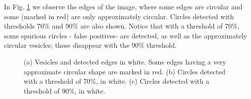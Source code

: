 \documentclass[oribibl]{llncs}
\begin{document}
In Fig. \ref{fig:umbralPorcentajeHough} we observe the edges of the image, where some edges are circular and some (marked in red) are only approximately circular. Circles detected with thresholds  70\% and 90\% are also shown. 
Notice that with a threshold of 70\%, some spurious circles - false positives- are detected, as well as the approximately circular vesicles; these disappear with the  90\% threshold.
\begin{figure}
\centering
\label{fig:bordesDetectados}
\caption{(a) Vesicles and detected edges in white. Some edges having a very approximate circular shape are marked in red. (b) Circles detected with a threshold of 70\%, in white.  (c) Circles detected with a threshold of 90\%, in white.} 
\label{fig:umbralPorcentajeHough}
\end{figure}
\end{document}
